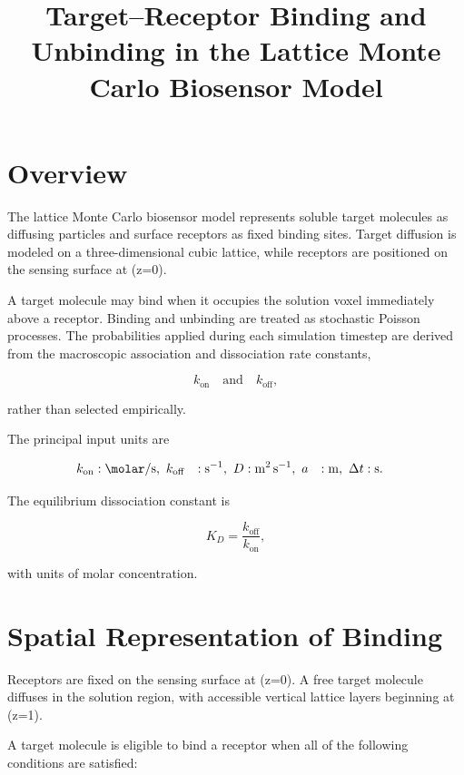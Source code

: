 \documentclass[11pt]{article}
\title{Target--Receptor Binding and Unbinding in the Lattice Monte Carlo Biosensor Model}
\author{}
\date{}
\begin{document}
\maketitle

\section{Overview}

The lattice Monte Carlo biosensor model represents soluble target molecules as diffusing particles and surface receptors as fixed binding sites. Target diffusion is modeled on a three-dimensional cubic lattice, while receptors are positioned on the sensing surface at (z=0).

A target molecule may bind when it occupies the solution voxel immediately above a receptor. Binding and unbinding are treated as stochastic Poisson processes. The probabilities applied during each simulation timestep are derived from the macroscopic association and dissociation rate constants,

\begin{equation}
k_{\mathrm{on}}
\quad \text{and} \quad
k_{\mathrm{off}},
\end{equation}

rather than selected empirically.

The principal input units are

\begin{align}
k_{\mathrm{on}} &: \si{\per\molar\per\second},\
k_{\mathrm{off}} &: \si{\per\second},\
D &: \si{\meter\squared\per\second},\
a &: \si{\meter},\
\Delta t &: \si{\second}.
\end{align}

The equilibrium dissociation constant is

\begin{equation}
K_D
=
\frac{k_{\mathrm{off}}}{k_{\mathrm{on}}},
\end{equation}

with units of molar concentration.

\section{Spatial Representation of Binding}

Receptors are fixed on the sensing surface at (z=0). A free target molecule diffuses in the solution region, with accessible vertical lattice layers beginning at (z=1).

A target molecule is eligible to bind a receptor when all of the following conditions are satisfied:
\end{document}
